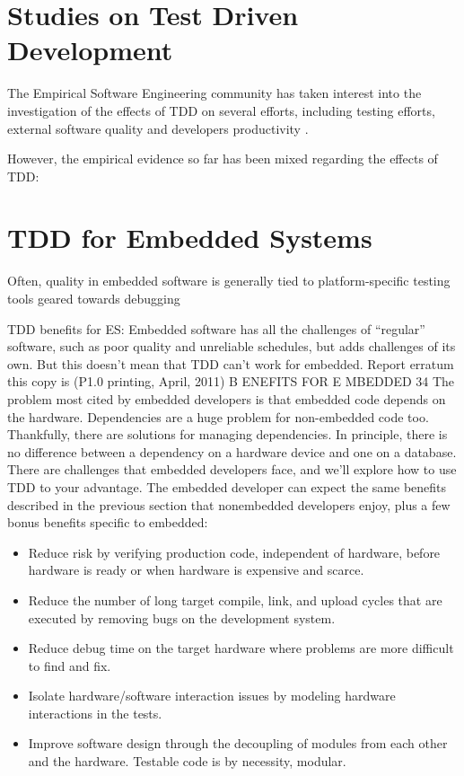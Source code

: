 \section{Studies on Test Driven Development}
The Empirical Software Engineering community has taken interest into the investigation of the effects of TDD on several efforts, including testing efforts, external software quality and developers productivity \cite{DBLP:conf/esem/FucciS0SSUTJO16} \cite{DBLP:journals/tse/ErdogmusMT05} \cite{DBLP:journals/infsof/Madeyski10}.

However, the empirical evidence so far has been mixed regarding the effects of TDD:



\section{TDD for Embedded Systems}
Often, quality in embedded software is generally tied to platform-specific testing tools geared towards debugging \cite{TDDEmbeddedSoftware}



TDD benefits for ES:
Embedded software has all the challenges of “regular” software, such as
poor quality and unreliable schedules, but adds challenges of its own.
But this doesn't mean that TDD can't work for embedded.
Report erratum
this copy is (P1.0 printing, April, 2011)
B ENEFITS FOR E MBEDDED 34
The problem most cited by embedded developers is that embedded
code depends on the hardware. Dependencies are a huge problem for
non-embedded code too. Thankfully, there are solutions for managing
dependencies. In principle, there is no difference between a dependency
on a hardware device and one on a database.
There are challenges that embedded developers face, and we’ll explore
how to use TDD to your advantage. The embedded developer can expect
the same benefits described in the previous section that nonembedded
developers enjoy, plus a few bonus benefits specific to embedded:
\begin{itemize}
    \item Reduce risk by verifying production code, independent of hardware, before hardware is ready or when hardware is expensive and scarce.
    \item Reduce the number of long target compile, link, and upload cycles that are executed by removing bugs on the development system.
    \item Reduce debug time on the target hardware where problems are more difficult to find and fix.
    \item Isolate hardware/software interaction issues by modeling hardware interactions in the tests.
    \item Improve software design through the decoupling of modules from each other and the hardware. Testable code is by necessity, modular.
\end{itemize}


